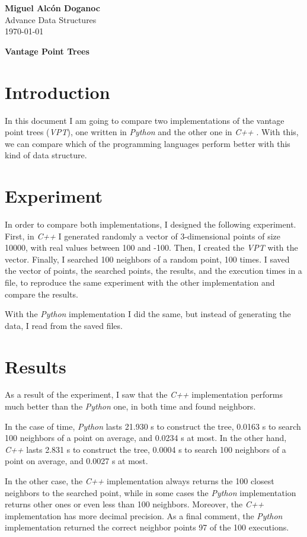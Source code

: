 \documentclass[a4paper, 10pt]{article}
\begin{document}
\noindent
\begin{flushright}
    \large\textbf{Miguel Alcón Doganoc} \\
    Advance Data Structures \\
    \today
\end{flushright}

\noindent
{\huge{\textbf{Vantage Point Trees}}}

\section*{Introduction}
In this document I am going to compare two implementations of the vantage point trees (\textit{VPT}), one written in \textit{Python} \cite{python} and the other one in \textit{C++} \cite{cpp}. With this, we can compare which of the programming languages perform better with this kind of data structure.

\section*{Experiment}
In order to compare both implementations, I designed the following experiment. First, in \textit{C++} I generated randomly a vector of 3-dimensional points of size 10000, with real values between 100 and -100. Then, I created the \textit{VPT} with the vector. Finally, I searched 100 neighbors of a random point, 100 times. I saved the vector of points, the searched points, the results, and the execution times in a file, to reproduce the same experiment with the other implementation and compare the results.

With the \textit{Python} implementation I did the same, but instead of generating the data, I read from the saved files.

\section*{Results}
As a result of the experiment, I saw that the \textit{C++} implementation performs much better than the \textit{Python} one, in both time and found neighbors.

In the case of time, \textit{Python} lasts 21.930 s to construct the tree, 0.0163 s to search 100 neighbors of a point on average, and 0.0234 s at most. In the other hand, \textit{C++} lasts 2.831 s to construct the tree, 0.0004 s to search 100 neighbors of a point on average, and 0.0027 s at most.

In the other case, the \textit{C++} implementation always returns the 100 closest neighbors to the searched point, while in some cases the \textit{Python} implementation returns other ones or even less than 100 neighbors. Moreover, the \textit{C++} implementation has more decimal precision. As a final comment, the \textit{Python} implementation returned the correct neighbor points 97 of the 100 executions.



\end{document}
